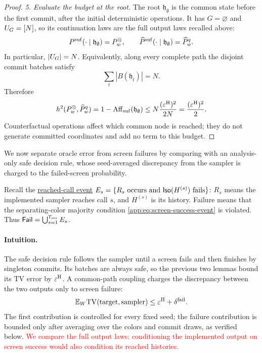 \begin{proof}
\emph{5. Evaluate the budget at the root.}
The root $\mathfrak h_{\emptyset}$ is the common state before the first
commit, after the initial deterministic operations.  It has $G=\varnothing$
and $U_{G}=[N]$, so its continuation laws are the
full output laws recalled above:
\[
 P^{\mathrm{suf}}(\cdot\mid \mathfrak h_{\emptyset})=P_{w}^{\otimes},
 \qquad
 \widehat P^{\mathrm{suf}}(\cdot\mid \mathfrak h_{\emptyset})
 =\widehat P_{w}^{q}.
\]
In particular, $|U_{G}|=N$.  Equivalently, along every complete
path the disjoint commit batches satisfy
\begin{equation}
 \sum_t|B(\mathfrak h_t)|=N.
 \label{app:eq:path-batches-partition-N}
\end{equation}
Therefore
\begin{equation}
 h^2(P_{w}^{\otimes},
              \widehat P_{w}^{q})
 =1-\operatorname{Aff}_{\mathrm{suf}}(\mathfrak h_{\emptyset})
 \le N\frac{(\varepsilon^{\mathrm H})^2}{2N}
 =\frac{(\varepsilon^{\mathrm H})^2}{2}.
 \label{app:eq:root-path-budget}
\end{equation}
Counterfactual operations affect which common node is reached; they do not
generate committed coordinates and add no term to this budget.
\end{proof}

We now separate oracle error from screen failures by comparing with an
analysis-only safe decision rule, whose seed-averaged discrepancy from the
sampler is charged to the failed-screen probability.

Recall the \hyperlink{app-reached-screen-failure}{reached-call event}
$E_s=\{R_s\text{ occurs and }\mathsf{Iso}(H^{(s)})\text{ fails}\}$:
$R_s$ means the implemented sampler reaches call $s$, and $H^{(s)}$ is
its history.  Failure means that the separating-color majority condition
\eqref{app:eq:screen-success-event} is violated.
Thus $\mathsf{Fail}=\bigcup_{s=1}^{T_{\mathrm{scr}}}E_s$.

\paragraph{Intuition.}
The safe decision rule follows the sampler until a screen fails and then
finishes by singleton commits.  Its batches are always safe, so the previous
two lemmas bound its TV error by $\varepsilon^{\mathrm H}$.  A common-path coupling
charges the discrepancy between the two outputs only to screen failure:
\[
 \mathbb E_W\mathrm{TV}(\hbox{target},\hbox{sampler})
 \le\varepsilon^{\mathrm H}+\delta^{\mathrm{fail}}.
\]
The first contribution is controlled for every fixed seed; the failure
contribution is bounded only after averaging over the colors and commit
draws, as verified below.
\textcolor{red}{We compare the full output laws: conditioning the implemented
output on screen success would also condition its reached histories.}

